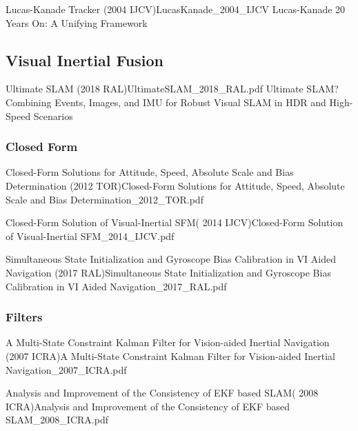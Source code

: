 \documentclass[10pt,a4paper]{scrartcl}
\begin{document}
\begin{multicols*}{2}
\begin{Paper}{Lucas-Kanade Tracker (2004 IJCV)}{LucasKanade_2004_IJCV}
Lucas-Kanade 20 Years On: A Unifying Framework
\end{Paper}

\subsection{Visual Inertial Fusion}

\begin{Paper}{Ultimate SLAM (2018 RAL)}{UltimateSLAM_2018_RAL.pdf}
Ultimate SLAM? Combining Events, Images, and IMU for Robust Visual SLAM in HDR and High-Speed Scenarios
\end{Paper}

\subsubsection{Closed Form}

\begin{Paper}{Closed-Form Solutions for Attitude, Speed, Absolute Scale and Bias Determination (2012 TOR)}{Closed-Form Solutions for Attitude, Speed, Absolute Scale and Bias Determination_2012_TOR.pdf}
\end{Paper}

\begin{Paper}{Closed-Form Solution of Visual-Inertial SFM( 2014 IJCV)}{Closed-Form Solution of Visual-Inertial SFM_2014_IJCV.pdf}
\end{Paper}

\begin{Paper}{Simultaneous State Initialization and Gyroscope Bias Calibration in VI Aided Navigation (2017 RAL)}{Simultaneous State Initialization and Gyroscope Bias Calibration in VI Aided Navigation_2017_RAL.pdf}
\end{Paper}

\subsubsection{Filters}

\begin{Paper}{A Multi-State Constraint Kalman Filter for Vision-aided Inertial Navigation (2007 ICRA)}{A Multi-State Constraint Kalman Filter for Vision-aided Inertial Navigation_2007_ICRA.pdf}
\end{Paper}

\begin{Paper}{Analysis and Improvement of the Consistency of EKF based SLAM( 2008 ICRA)}{Analysis and Improvement of the Consistency of EKF based SLAM_2008_ICRA.pdf}
\end{Paper}


\end{multicols*}
\end{document}
